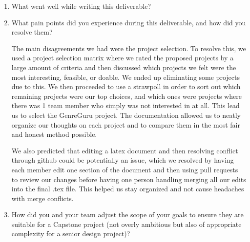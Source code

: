 \documentclass{article}
\begin{document}
\begin{enumerate}
    \item What went well while writing this deliverable? 
    \item What pain points did you experience during this deliverable, and how
    did you resolve them?
    
The main disagreements we had were the project selection. To resolve this, we used a project selection matrix 
where we rated the proposed projects by a large amount of criteria and then discussed which projects we felt
were the most interesting, feasible, or doable. We ended up eliminating some projects due to this. We then proceeded to use a strawpoll in order to sort out which
remaining projects were our top choices, and which ones were projects where there was 1 team member who simply was not
interested in at all. This lead us to select the GenreGuru project. The documentation allowed us to neatly organize our
thoughts on each project and to compare them in the most fair and honest method possible. 

We also predicted that editing a latex
document and then resolving conflict through github could be potentially an issue, which we resolved by having each member 
edit one section of the document and then using pull requests to review our changes before having one person handling merging
all our edits into the final .tex file. This helped us stay organized and not cause headaches with merge conflicts. 

    \item How did you and your team adjust the scope of your goals to ensure
    they are suitable for a Capstone project (not overly ambitious but also of
    appropriate complexity for a senior design project)?
\end{enumerate}  
\end{document}
